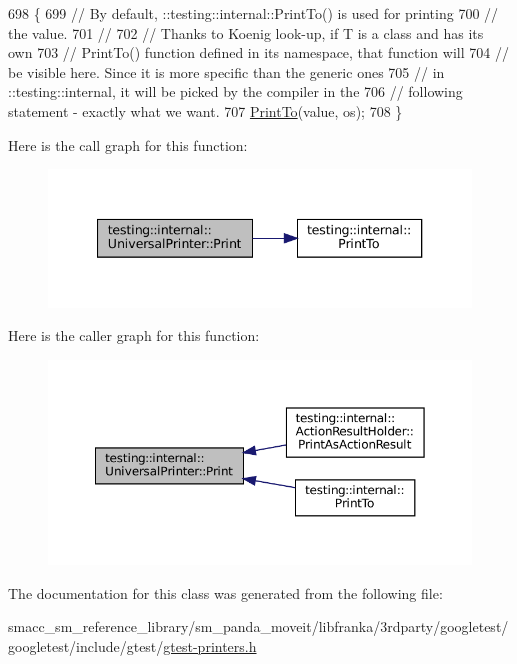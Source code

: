 \begin{DoxyCode}
698                                                     \{
699     \textcolor{comment}{// By default, ::testing::internal::PrintTo() is used for printing}
700     \textcolor{comment}{// the value.}
701     \textcolor{comment}{//}
702     \textcolor{comment}{// Thanks to Koenig look-up, if T is a class and has its own}
703     \textcolor{comment}{// PrintTo() function defined in its namespace, that function will}
704     \textcolor{comment}{// be visible here.  Since it is more specific than the generic ones}
705     \textcolor{comment}{// in ::testing::internal, it will be picked by the compiler in the}
706     \textcolor{comment}{// following statement - exactly what we want.}
707     \hyperlink{namespacetesting_1_1internal_a8fd10cc30084c36a89c74868c8bd53f8}{PrintTo}(value, os);
708   \}
\end{DoxyCode}
Here is the call graph for this function\+:
\nopagebreak
\begin{figure}[H]
\begin{center}
\leavevmode
\includegraphics[width=340pt]{classtesting_1_1internal_1_1UniversalPrinter_aecec021e1abbaa260b701e24e3fe33eb_cgraph}
\end{center}
\end{figure}
Here is the caller graph for this function\+:
\nopagebreak
\begin{figure}[H]
\begin{center}
\leavevmode
\includegraphics[width=350pt]{classtesting_1_1internal_1_1UniversalPrinter_aecec021e1abbaa260b701e24e3fe33eb_icgraph}
\end{center}
\end{figure}


The documentation for this class was generated from the following file\+:\begin{DoxyCompactItemize}
\item 
smacc\+\_\+sm\+\_\+reference\+\_\+library/sm\+\_\+panda\+\_\+moveit/libfranka/3rdparty/googletest/googletest/include/gtest/\hyperlink{gtest-printers_8h}{gtest-\/printers.\+h}\end{DoxyCompactItemize}
